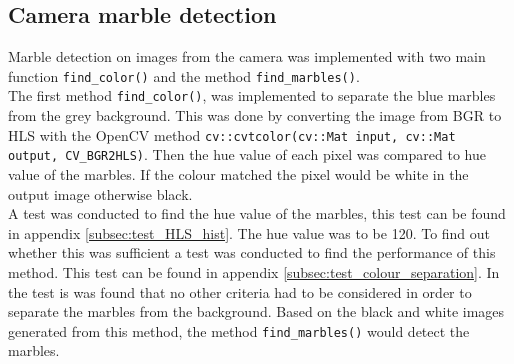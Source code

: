 \documentclass[../Head/Main.tex]{subfiles}
\begin{document}
\subsection{Camera marble detection}
Marble detection on images from the camera was implemented with two main function \texttt{find\_color()} and the method \texttt{find\_marbles()}.\\
The first method \texttt{find\_color()}, was implemented to separate the blue marbles from the grey background. This was done by converting the image from BGR to HLS with the OpenCV method \texttt{cv::cvtcolor(cv::Mat input, cv::Mat output, CV\_BGR2HLS)}. Then the hue value of each pixel was compared to hue value of the marbles. If the colour matched the pixel would be white in the output image otherwise black.\\
A test was conducted to find the hue value of the marbles, this test can be found in appendix \ref{subsec:test_HLS_hist}. The hue value was to be 120. To find out whether this was sufficient a test was conducted to find the performance of this method. This test can be found in appendix \ref{subsec:test_colour_separation}. In the test is was found that no other criteria had to be considered in order to separate the marbles from the background. Based on the black and white images generated from this method, the method \texttt{find\_marbles()} would detect the marbles.\par 
\end{document}
